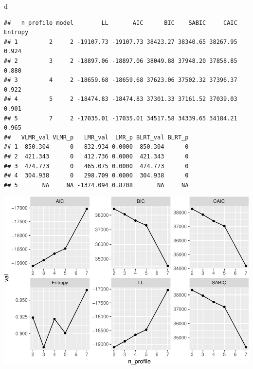 \documentclass[]{book}
\newenvironment{Shaded}{\begin{snugshade}}{\end{snugshade}}
\newcommand{\KeywordTok}[1]{\textcolor[rgb]{0.13,0.29,0.53}{\textbf{#1}}}
\newcommand{\DataTypeTok}[1]{\textcolor[rgb]{0.13,0.29,0.53}{#1}}
\newcommand{\StringTok}[1]{\textcolor[rgb]{0.31,0.60,0.02}{#1}}
\newcommand{\OperatorTok}[1]{\textcolor[rgb]{0.81,0.36,0.00}{\textbf{#1}}}
\newcommand{\NormalTok}[1]{#1}
\begin{document}
\begin{Shaded}
\begin{Highlighting}[]
\NormalTok{d}
\end{Highlighting}
\end{Shaded}

\begin{verbatim}
##   n_profile model        LL       AIC      BIC    SABIC     CAIC Entropy
## 1         2     2 -19107.73 -19107.73 38423.27 38340.65 38267.95   0.924
## 2         3     2 -18897.06 -18897.06 38049.88 37948.20 37858.85   0.880
## 3         4     2 -18659.68 -18659.68 37623.06 37502.32 37396.37   0.922
## 4         5     2 -18474.83 -18474.83 37301.33 37161.52 37039.03   0.901
## 5         7     2 -17035.01 -17035.01 34517.58 34339.65 34184.21   0.965
##   VLMR_val VLMR_p   LMR_val  LMR_p BLRT_val BLRT_p
## 1  850.304      0   832.934 0.0000  850.304      0
## 2  421.343      0   412.736 0.0000  421.343      0
## 3  474.773      0   465.075 0.0000  474.773      0
## 4  304.938      0   298.709 0.0000  304.938      0
## 5       NA     NA -1374.094 0.8708       NA     NA
\end{verbatim}

\begin{Shaded}
\end{Shaded}

\includegraphics{rosenberg-dissertation_files/figure-latex/compare-solutions-model2-1.pdf}
\end{document}
